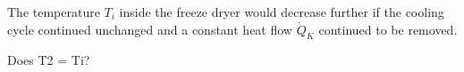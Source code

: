 The temperature \( T_i \) inside the freeze dryer would decrease further if the cooling cycle continued unchanged and a constant heat flow \( \dot{Q}_K \) continued to be removed.

Does T2 = Ti?
